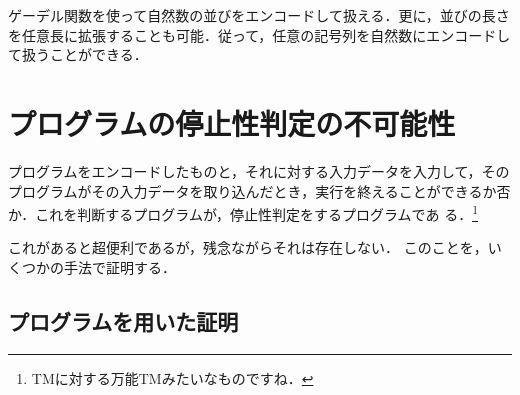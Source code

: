 ゲーデル関数を使って自然数の並びをエンコードして扱える．更に，並びの長さ
を任意長に拡張することも可能．従って，任意の記号列を自然数にエンコードし
て扱うことができる．


\section{プログラムの停止性判定の不可能性} 
プログラムをエンコードしたものと，それに対する入力データを入力して，その
プログラムがその入力データを取り込んだとき，実行を終えることができるか否
か．これを判断するプログラムが，停止性判定をするプログラムであ
る．\footnote{TMに対する万能TMみたいなものですね．}

これがあると超便利であるが，残念ながらそれは存在しない．
このことを，いくつかの手法で証明する．

\subsection{プログラムを用いた証明}
